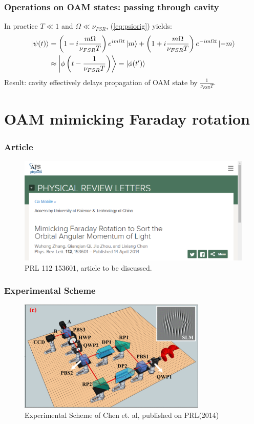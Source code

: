 \documentclass[amssymb, amsmath]{beamer}
\begin{document}
\begin{frame}
\frametitle{Operations on OAM states: passing through cavity}

    In practice $T\ll1$ and $\Omega\ll\nu_{FSR}$, (\ref{eq:psiorig}) yields:
\begin{align}
    \ket{\psi(t)} &= \left(1-i\frac{m \Omega}{\nu_{FSR}T}\right)e^{i m \Omega t}\ket{m}
    +\left(1+i\frac{m \Omega}{\nu_{FSR}T}\right)e^{-i m \Omega t}\ket{-m} \\
    &\approx \Ket{\phi\left(t-\frac{1}{\nu_{FSR} T}\right)}=\ket{\phi(t^\prime)}
    \end{align}
\textcolor{midori}{Result: cavity effectively delays propagation of OAM state by $\frac{1}{\nu_{FSR} T}$}.

\end{frame}

\section{OAM mimicking Faraday rotation}

\begin{frame}
\frametitle{Article}

\begin{figure}
    \centering
    \includegraphics[width=0.80\columnwidth]{fig/title.png}
    \caption{PRL 112 153601, article to be discussed.}
\end{figure}

\end{frame}

\begin{frame}
\frametitle{Experimental Scheme}
\begin{figure}
    \centering
    \includegraphics[width=0.80\textwidth]{fig/scheme_large.png}
    \caption{Experimental Scheme of Chen et. al, published on PRL(2014)}
    \label{fig:scheme_PRL}
\end{figure}

\end{frame}
\end{document}

